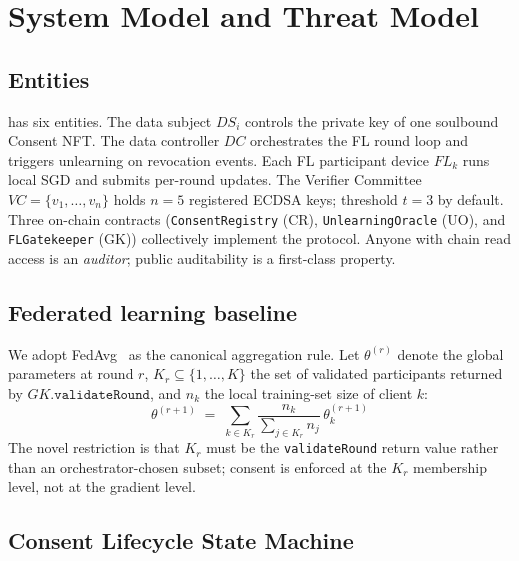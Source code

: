 \section{System Model and Threat Model}
\label{sec:system-model}

\subsection{Entities}

\sysname has six entities. The data subject $\mathit{DS}_i$ controls
the private key of one soulbound Consent NFT. The data controller
$\mathit{DC}$ orchestrates the FL round loop and triggers unlearning
on revocation events. Each FL participant device $\mathit{FL}_k$ runs
local SGD and submits per-round updates. The Verifier Committee
$\mathit{VC} = \{v_1, \ldots, v_n\}$ holds $n=5$ registered ECDSA
keys; threshold $t=3$ by default. Three on-chain contracts
(\texttt{ConsentRegistry} (CR), \texttt{UnlearningOracle} (UO), and
\texttt{FLGatekeeper} (GK)) collectively implement the protocol.
Anyone with chain read access is an \emph{auditor}; public
auditability is a first-class property.

\subsection{Federated learning baseline}

We adopt FedAvg~\cite{mcmahan2017fedavg} as the canonical aggregation
rule. Let $\theta^{(r)}$ denote the global parameters at round $r$,
$K_r \subseteq \{1,\ldots,K\}$ the set of validated participants
returned by $\mathit{GK}.\mathtt{validateRound}$, and $n_k$ the local
training-set size of client $k$:
\begin{equation}\label{eq:fedavg}
    \theta^{(r+1)} \;=\; \sum_{k \in K_r}
        \frac{n_k}{\sum_{j \in K_r} n_j} \,\theta^{(r+1)}_k
\end{equation}
The novel restriction is that $K_r$ must be the
\texttt{validateRound} return value rather than an
orchestrator-chosen subset; consent is enforced at the
$K_r$ membership level, not at the gradient level.

\subsection{Consent Lifecycle State Machine}
\label{sec:clsm-formal}

